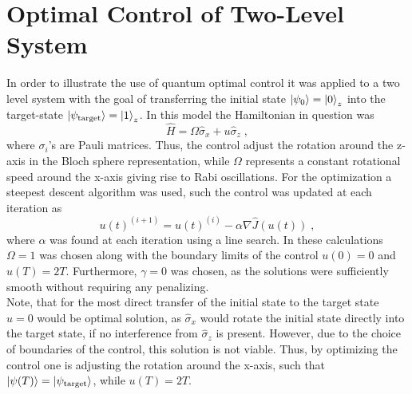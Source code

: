 \chapter{Optimal Control of Two-Level System}
In order to illustrate the use of quantum optimal control it was applied to a two level system with the goal of transferring the initial state $\ket{\psi _0} = \ket{0}_z$ into the target-state $\ket{\psi _{\mathrm{target}}} = \ket{1}_z$. In this model the Hamiltonian in question was
\begin{equation}
	\hat{H} = \Omega \hat{\sigma}_x + u \hat{\sigma}_z \; ,
\end{equation}
where $\sigma_i$'s are Pauli matrices. Thus, the control adjust the rotation around the z-axis in the Bloch sphere representation, while $\Omega$ represents a constant rotational speed around the x-axis giving rise to Rabi oscillations.
For the optimization a steepest descent algorithm was used, such the control was updated at each iteration as
\begin{equation}
	u(t)^{(i+1)} = u(t)^{(i)} - \alpha \nabla \hat{J}(u(t)) \; ,
\end{equation}
where $\alpha$ was found at each iteration using a line search.
In these calculations $\Omega = 1$ was chosen along with the boundary limits of the control $u(0) = 0$ and $u(T) = 2 T$. Furthermore, $\gamma = 0$ was chosen, as the solutions were sufficiently smooth without requiring any penalizing.\\
Note, that for the most direct transfer of the initial state to the target state $u = 0$ would be optimal solution, as $\hat{\sigma}_x$ would rotate the initial state directly into the target state, if no interference from $\hat{\sigma}_z$ is present. However, due to the choice of boundaries of the control, this solution is not viable. Thus, by optimizing the control one is adjusting the rotation around the x-axis, such that $\ket{\psi (T)} = \ket{\psi _{\mathrm{target}}}$, while $u(T) = 2 T$.

